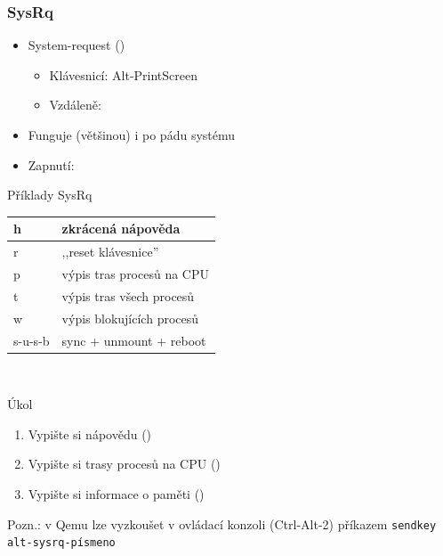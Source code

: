 \begin{frame}
  \frametitle{SysRq}

  \begin{itemize}
    \item System-request ()
    \begin{itemize}
      \item Klávesnicí: Alt-PrintScreen
      \item Vzdáleně: 
    \end{itemize}

    \pause

    \item Funguje (většinou) i po pádu systému
    \item Zapnutí: 
  \end{itemize}

  \pause

  \begin{block}{Příklady SysRq}
  \begin{center}
  \small
  \begin{tabular}{|l|l|} \hline
  h & zkrácená nápověda \\ \hline
  r & ,,reset klávesnice'' \\ \hline
  p & výpis tras procesů na CPU \\ \hline
  t & výpis tras všech procesů \\ \hline
  w & výpis blokujících procesů \\ \hline
  s-u-s-b & sync + unmount + reboot \\ \hline
  \end{tabular} \\[2mm]
  \end{center}
  \end{block}

\end{frame}


\begin{frame}{Úkol}

  \begin{enumerate}
    \item Vypište si nápovědu ()
    \item Vypište si trasy procesů na CPU ()
    \item Vypište si informace o paměti ()
  \end{enumerate}

  \bigskip

  Pozn.: v Qemu lze vyzkoušet v ovládací konzoli (Ctrl-Alt-2) příkazem
  \texttt{sendkey alt-sysrq-písmeno}

\end{frame}

